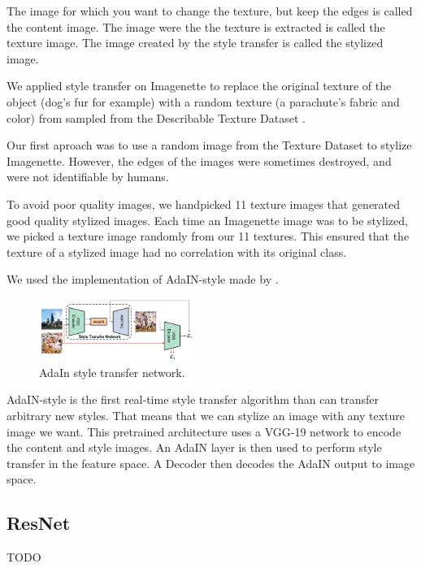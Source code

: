 \documentclass{article}
\begin{document}
\noindent
The image for which you want to change the texture, but keep the edges is called the content image.
The image were the the texture is extracted is called the texture image.
The image created by the style transfer is called the stylized image. \smallskip

\noindent
We applied style transfer on Imagenette to replace the original texture of the object (dog's fur for example) 
with a random texture (a parachute's fabric and color) 
from sampled from the Describable Texture Dataset \cite{cimpoi14describing}. \smallskip

\noindent
Our first aproach was to use a random image from the Texture Dataset to stylize Imagenette. However, 
the edges of the images were sometimes destroyed, and were not identifiable by humans. \smallskip

\noindent
To avoid poor quality images, we handpicked 11 texture images that generated good quality stylized images.
Each time an Imagenette image was to be stylized, we picked a texture image randomly from our 11 textures.
This ensured that the texture of a stylized image had no correlation with its original class. \smallskip

\noindent
We used the implementation of AdaIN-style \cite{huang2017arbitrary} made by \cite{stylizeddatasets2019}.
\begin{figure}[h!]\center
  \includegraphics[width=0.45\textwidth]{imgs/adain_architecture}
  \caption{AdaIn style transfer network.}
\end{figure}

AdaIN-style is the first real-time style transfer algorithm than can transfer arbitrary new styles.
That means that we can stylize an image with any texture image we want.
This pretrained architecture uses a VGG-19 network to encode the content and style images.
An AdaIN layer is then used to perform style transfer in the feature space.   
A Decoder then decodes the AdaIN output to image space.

\subsection{ResNet}

TODO
\end{document}
